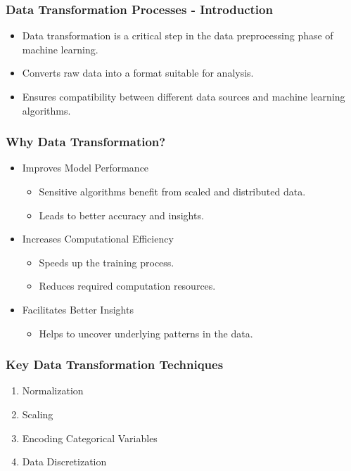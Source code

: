 \documentclass[aspectratio=169]{beamer}
\begin{document}
\begin{frame}[fragile]
    \frametitle{Data Transformation Processes - Introduction}
    \begin{itemize}
        \item Data transformation is a critical step in the data preprocessing phase of machine learning.
        \item Converts raw data into a format suitable for analysis.
        \item Ensures compatibility between different data sources and machine learning algorithms.
    \end{itemize}
\end{frame}

\begin{frame}[fragile]
    \frametitle{Why Data Transformation?}
    \begin{itemize}
        \item Improves Model Performance
        \begin{itemize}
            \item Sensitive algorithms benefit from scaled and distributed data.
            \item Leads to better accuracy and insights.
        \end{itemize}
        \item Increases Computational Efficiency
        \begin{itemize}
            \item Speeds up the training process.
            \item Reduces required computation resources.
        \end{itemize}
        \item Facilitates Better Insights
        \begin{itemize}
            \item Helps to uncover underlying patterns in the data.
        \end{itemize}
    \end{itemize}
\end{frame}

\begin{frame}[fragile]
    \frametitle{Key Data Transformation Techniques}
    \begin{enumerate}
        \item Normalization
        \item Scaling
        \item Encoding Categorical Variables
        \item Data Discretization
    \end{enumerate}
\end{frame}
\end{document}
